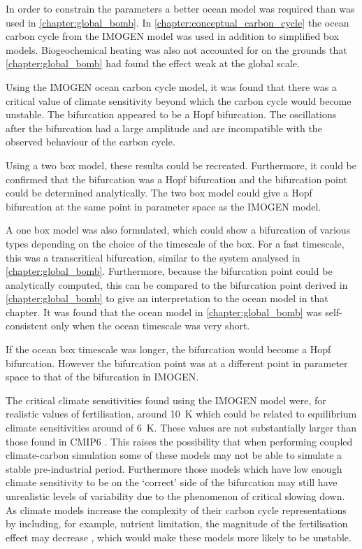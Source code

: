 In order to constrain the parameters a better ocean model was required than was used in \cref{chapter:global_bomb}. In \cref{chapter:conceptual_carbon_cycle}
the ocean carbon cycle from the IMOGEN model was used in addition to simplified box models. Biogeochemical heating was also not accounted for on the grounds
that \cref{chapter:global_bomb} had found the effect weak at the global scale.

Using the IMOGEN ocean carbon cycle model, it was found that there was a critical value of climate sensitivity beyond which the carbon cycle would become unstable.
The bifurcation appeared to be a Hopf bifurcation. The oscillations after the bifurcation had a large amplitude and are incompatible with the observed behaviour of the
carbon cycle.

Using a two box model, these results could be recreated. Furthermore, it could be confirmed that the bifurcation was a Hopf bifurcation and the bifurcation point
could be determined analytically. The two box model could give a Hopf bifurcation at the same point in parameter space as the IMOGEN model.

A one box model was also formulated, which could show a bifurcation of various types depending on the choice of the timescale of the box.
For a fast timescale, this was a transcritical bifurcation, similar to the system analysed in \cref{chapter:global_bomb}. Furthermore, because the bifurcation
point could be analytically computed, this can be compared to the bifurcation point derived in \cref{chapter:global_bomb} to give an interpretation to the
ocean model in that chapter. It was found that the ocean model in \cref{chapter:global_bomb} was self-consistent only when the ocean timescale was very short.

If the ocean box timescale was longer, the bifurcation would become a Hopf bifurcation. However the bifurcation point was at a different point in parameter space to that of the
bifurcation in IMOGEN.

The critical climate sensitivities found using the IMOGEN model were, for realistic values of  fertilisation, around \SI{10}{\kelvin} which could be
related to equilibrium climate sensitivities around of \SI{6}{\kelvin}. These values are not substantially larger than those found in CMIP6 \parencite{Zelinka2020}.
This raises the possibility that when performing coupled climate-carbon simulation some of these models may not be able to simulate a stable pre-industrial
period. Furthermore those models which have low enough climate sensitivity to be on the `correct' side of the bifurcation may still have unrealistic levels of  variability
due to the phenomenon of critical slowing down. As climate models increase the complexity of their carbon cycle representations by including, for example,
nutrient limitation, the magnitude of the  fertilisation effect may decrease \parencite{Wiltshire2021}, which would make these models more likely to be unstable.

